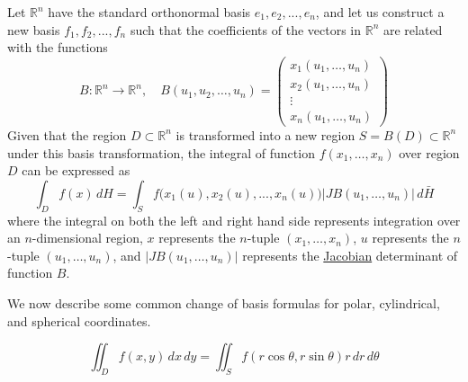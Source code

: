   \begin{theorem}
    \label{thm:integration-over-change-of-bases-in-rn}
    Let $\mathbb{R}^n$ have the standard orthonormal basis $e_1, e_2, ..., e_n$, and let us construct a new basis $f_1, f_2, ..., f_n$ such that the coefficients of the vectors in $\mathbb{R}^n$ are related with the functions
    \begin{equation}
      B: \mathbb{R}^n \to \mathbb{R}^n, \quad B(u_1, u_2, \ldots, u_n) = \begin{pmatrix}
          x_1 (u_1, \ldots, u_n) \\x_2 (u_1, \ldots, u_n) \\ \vdots \\ x_n (u_1, \ldots, u_n)
          \end{pmatrix}
    \end{equation}
    Given that the region $D \subset \mathbb{R}^n$ is transformed into a new region $S = B(D) \subset \mathbb{R}^n$ under this basis transformation, the integral of function $f(x_1, \ldots, x_n)$ over region $D$ can be expressed as 
    \begin{equation}
      \int_D f(x) \, dH = \int_S f \big( x_1(u), x_2(u), ..., x_n (u) \big) \big| J B(u_1, \ldots, u_n)\big| \, d \bar{H}
    \end{equation}
    where the integral on both the left and right hand side represents integration over an $n$-dimensional region, $x$ represents the $n$-tuple $(x_1, \ldots, x_n)$, $u$ represents the $n$-tuple $(u_1, \ldots, u_n)$, and $\big| J B(u_1, \ldots, u_n)\big|$ represents the \hyperref[def:jacobian]{Jacobian} determinant of function $B$. 
  \end{theorem}

  We now describe some common change of basis formulas for polar, cylindrical, and spherical coordinates. 

  \begin{theorem}
    \label{thm:integration-in-polar-coordinates}
    \begin{equation}
      \iint_{D} f(x, y) \, dx \,dy = \iint_S f(r \cos{\theta}, r \sin{\theta}) r \, dr \, d\theta
    \end{equation}
  \end{theorem}

